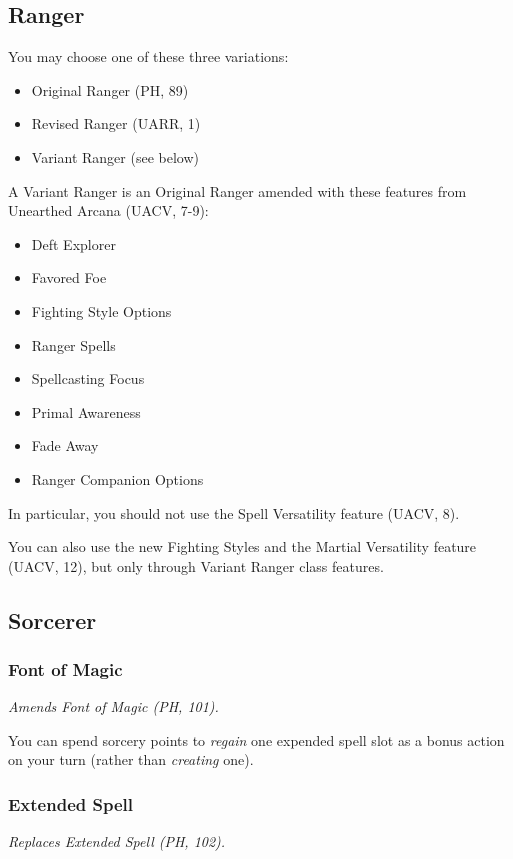 \documentclass[letterpaper,twocolumn,openany,nodeprecatedcode]{dndbook}
\begin{document}
\subsection{Ranger}
\label{classRanger}

You may choose one of these three variations:

\begin{itemize}
    \item Original Ranger (PH, 89)
    \item Revised Ranger (UARR, 1)
    \item Variant Ranger (see below)
\end{itemize}

A Variant Ranger is an Original Ranger amended with these features from Unearthed Arcana (UACV, 7-9):

\begin{itemize}
    \item Deft Explorer
    \item Favored Foe
    \item Fighting Style Options
    \item Ranger Spells
    \item Spellcasting Focus
    \item Primal Awareness
    \item Fade Away
    \item Ranger Companion Options
\end{itemize}

In particular, you should not use the Spell Versatility feature (UACV, 8).

You can also use the new Fighting Styles and the Martial Versatility feature (UACV, 12), but only through Variant Ranger class features.

\subsection{Sorcerer}

\subsubsection{Font of Magic}
\textit{Amends Font of Magic (PH, 101).}

You can spend sorcery points to \textit{regain} one expended spell slot as a bonus action on your turn (rather than \textit{creating} one).

\subsubsection{Extended Spell}
\textit{Replaces Extended Spell (PH, 102).}
\end{document}
